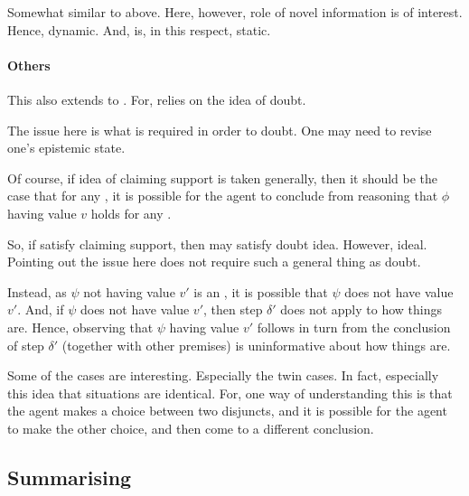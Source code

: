 \begin{note}[Issue]
  Somewhat similar to above.
  Here, however, role of novel information is of interest.
  Hence, dynamic.
  And, \csN{} is, in this respect, static.
\end{note}


\paragraph{Others}

\begin{note}
  This also extends to \citeauthor{Wright:2011wn}.
  For, \citeauthor{Wright:2011wn} relies on the idea of doubt.

  The issue here is what is required in order to doubt.
  One may need to revise one's epistemic state.

  Of course, if idea of claiming support is taken generally, then it should be the case that for any \epPW{}, it is possible for the agent to conclude from reasoning that \(\phi\) having value \(v\) holds for any \epVAd{} \world{}.

  So, if satisfy claiming support, then may satisfy doubt idea.
  However, ideal.
  Pointing out the issue here does not require such a general thing as doubt.
\end{note}

\begin{note}
  Instead, as \(\psi\) not having value \(v'\) is an \ep{}, it is possible that \(\psi\) does not have value \(v'\).
  And, if \(\psi\) does not have value \(v'\), then step \(\delta'\) does not apply to how things are.
  Hence, observing that \(\psi\) having value \(v'\) follows in turn from the conclusion of step \(\delta'\) (together with other premises) is uninformative about how things are.
\end{note}

\begin{note}
  \color{red}
  Some of the \citeauthor{Wright:2011wn} cases are interesting.
  Especially the twin cases.
  In fact, especially this idea that situations are identical.
  For, one way of understanding this is that the agent makes a choice between two disjuncts, and it is possible for the agent to make the other choice, and then come to a different conclusion.
\end{note}

\subsection{Summarising}

